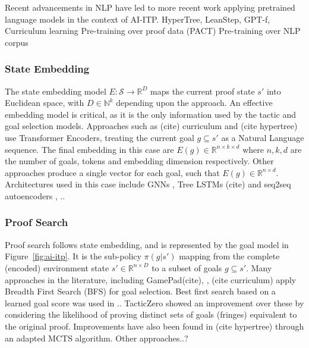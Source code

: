 \documentclass[letterpaper]{article} %
\begin{document}
    Recent advancements in NLP have led to more recent work applying pretrained language models in the context of AI-ITP.
    HyperTree, LeanStep, GPT-f, Curriculum learning
    Pre-training over proof data (PACT)
    Pre-training over NLP corpus

    \subsubsection{State Embedding}
    The state embedding model $E: \mathcal{S} \to \mathbb{R}^{D}$
    maps the current proof state $s'$ into Euclidean space, with $D \in \mathbb{N}^k$ depending upon the approach.
    An effective embedding model is critical, as it is the only information used by the tactic and goal selection models.
    Approaches such as (cite) curriculum and (cite hypertree) use Transformer Encoders,
    treating the current goal $g \subseteq s'$ as a Natural Language sequence.
    The final embedding in this case are $E(g) \in \mathbb{R}^{n \times k \times d}$ where $n, k, d$ are the number of
    goals, tokens and embedding dimension respectively.
    Other approaches produce a single vector for each goal, such that $E(g) \in \mathbb{R}^{n \times d}$.
    Architectures used in this case include GNNs \cite{bansal_learning_2019, paliwal_graph_2019, wang_premise_nodate},
    Tree LSTMs (cite) and seq2seq autoencoders \cite{wu_tacticzero_2021}, ..




    \subsubsection{Proof Search}
    Proof search follows state embedding, and is represented by the goal model in Figure~\ref{fig:ai-itp}.
    It is the sub-policy $\pi(g | s')$ mapping from the complete (encoded) environment state $s' \in \mathbb{R}^{n \times D}$
    to a subset of goals $g \subseteq s'$.
    Many approaches in the literature, including GamePad(cite), \cite{bansal_learning_2019}, (cite curriculum) apply Breadth First Search (BFS)
    for goal selection. Best first search based on a learned goal score was used in ..
    TacticZero \cite{wu_tacticzero_2021} showed an improvement over these by considering the likelihood of proving distinct sets of goals (fringes)
    equivalent to the original proof.
    Improvements have also been found in (cite hypertree) through an adapted MCTS algorithm. Other approaches..?
\end{document}
